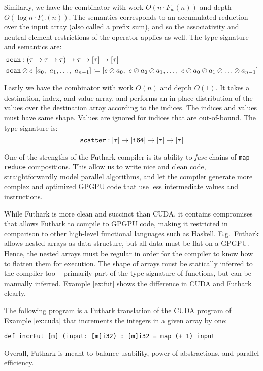Similarly, we have the combinator  with work $O(n\cdot F_w(n))$ and depth
$O(\log n \cdot F_w(n))$. The semantics corresponds to an accumulated reduction over
the input array (also called a prefix sum), and so the associativity and neutral
element restrictions of the operator applies as well. The type signature and
semantics are:
\begin{align}
  &\mathtt{scan}:(\tau \to \tau \to \tau) \to \tau \to \mathtt{[}\tau\mathtt{]} \to \mathtt{[}\tau\mathtt{]}\\
  & \mathtt{scan} \oslash e~[a_0,~a_1,\ldots, ~a_{n-1}] \coloneq [e \oslash a_0,~e \oslash a_0 \oslash a_1,\ldots,~e \oslash a_0 \oslash a_1 \oslash \ldots\oslash a_{n-1}]
\end{align}

Lastly we have the combinator  with work $O(n)$ and depth $O(1)$.
It takes a destination, index, and value array, and performs an in-place
distribution of the values over the destination array according to the
indices. The indices and values must have same shape. Values are ignored for
indices that are out-of-bound. The type signature is:
\begin{equation}
\mathtt{scatter}:\mathtt{[}\tau\mathtt{]} \to \mathtt{[}\mathtt{i64}\mathtt{]} \to \mathtt{[}\tau\mathtt{]} \to \mathtt{[}\tau\mathtt{]}
\end{equation}

One of the strengths of the Futhark compiler is its ability to \textit{fuse}
chains of \texttt{map}-\texttt{reduce} compositions. This allow us to write nice
and clean code, straightforwardly model parallel algorithms, and let the
compiler generate more complex and optimized GPGPU code that use less
intermediate values and instructions.

While Futhark is more clean and succinct than CUDA, it contains compromises that
allows Futhark to compile to GPGPU code, making it restricted in comparison to
other high-level functional languages such as Haskell. E.g.\ Futhark allows
nested arrays as data structure, but all data must be flat on a GPGPU. Hence,
the nested arrays must be regular in order for the compiler to know how to
flatten them for execution. The shape of arrays must be statically inferred to
the compiler too -- primarily part of the type signature of functions, but can be
manually inferred. Example \ref{ex:fut} shows the difference in CUDA and Futhark
clearly.

\begin{floatenv}
\begin{example}\label{ex:fut}
  The following program is a Futhark translation of the CUDA program of Example
  \ref{ex:cuda} that increments the integers in a given array by one:
\begin{lstlisting}[language=futhark]
def incrFut [m] (input: [m]i32) : [m]i32 = map (+ 1) input
\end{lstlisting}
\end{example}
\end{floatenv}

Overall, Futhark is meant to balance usability, power of abstractions, and
parallel efficiency.

